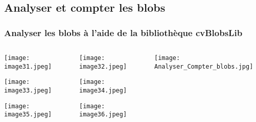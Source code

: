 \documentclass{beamer}
\begin{document}
\subsection{Analyser et compter les blobs} %

\begin{frame}
\frametitle{Analyser les blobs à l'aide de la bibliothèque cvBlobsLib}
\begin{columns}
\begin{column}{0.33\textwidth}
\begin{center}
    \texttt{[image: image31.jpeg]}

    \vspace{0.2cm}

    \texttt{[image: image33.jpeg]}

    \vspace{0.2cm}

    \texttt{[image: image35.jpeg]}
\end{center}
\end{column}

\begin{column}{0.33\textwidth}
\begin{center}
    \texttt{[image: image32.jpeg]}

    \vspace{0.2cm}

    \texttt{[image: image34.jpeg]}

    \vspace{0.2cm}

    \texttt{[image: image36.jpeg]}
\end{center}
\end{column}

\begin{column}{0.33\textwidth}
\centering
    \texttt{[image: Analyser\_Compter\_blobs.jpg]}
\end{column}
\end{columns}
\end{frame}
\end{document}
